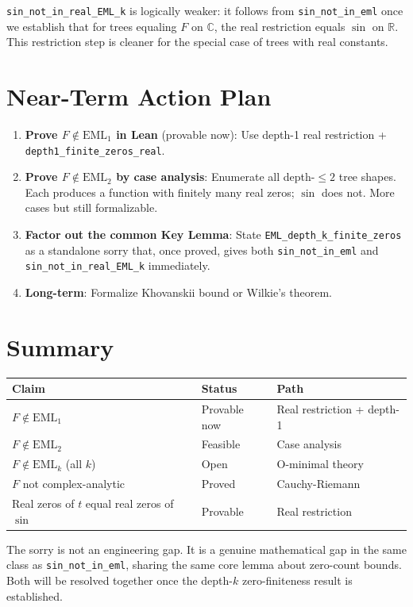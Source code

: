 \documentclass[12pt]{article}
\begin{document}
\texttt{sin\_not\_in\_real\_EML\_k} is logically weaker: it follows from
\texttt{sin\_not\_in\_eml} once we establish that for trees equaling $F$ on $\mathbb{C}$,
the real restriction equals $\sin$ on $\mathbb{R}$. This restriction step is cleaner
for the special case of trees with real constants.

\section{Near-Term Action Plan}

\begin{enumerate}
  \item \textbf{Prove $F \notin \mathrm{EML}_1$ in Lean} (provable now):
    Use depth-1 real restriction + \texttt{depth1\_finite\_zeros\_real}.

  \item \textbf{Prove $F \notin \mathrm{EML}_2$ by case analysis}:
    Enumerate all depth-$\leq 2$ tree shapes. Each produces a function with
    finitely many real zeros; $\sin$ does not. More cases but still formalizable.

  \item \textbf{Factor out the common Key Lemma}:
    State \texttt{EML\_depth\_k\_finite\_zeros} as a standalone sorry
    that, once proved, gives both \texttt{sin\_not\_in\_eml} and
    \texttt{sin\_not\_in\_real\_EML\_k} immediately.

  \item \textbf{Long-term}: Formalize Khovanskii bound or Wilkie's theorem.
\end{enumerate}

\section{Summary}

\begin{center}
\begin{tabular}{lll}
\toprule
Claim & Status & Path \\
\midrule
$F \notin \mathrm{EML}_1$ & \textcolor{proved}{Provable now} & Real restriction + depth-1 \\
$F \notin \mathrm{EML}_2$ & \textcolor{partial}{Feasible} & Case analysis \\
$F \notin \mathrm{EML}_k$ (all $k$) & \textcolor{open}{Open} & O-minimal theory \\
$F$ not complex-analytic & \textcolor{proved}{Proved} & Cauchy-Riemann \\
Real zeros of $t$ equal real zeros of $\sin$ & \textcolor{proved}{Provable} & Real restriction \\
\bottomrule
\end{tabular}
\end{center}

The sorry is not an engineering gap. It is a genuine mathematical gap in the same
class as \texttt{sin\_not\_in\_eml}, sharing the same core lemma about zero-count
bounds. Both will be resolved together once the depth-$k$ zero-finiteness result
is established.
\end{document}

